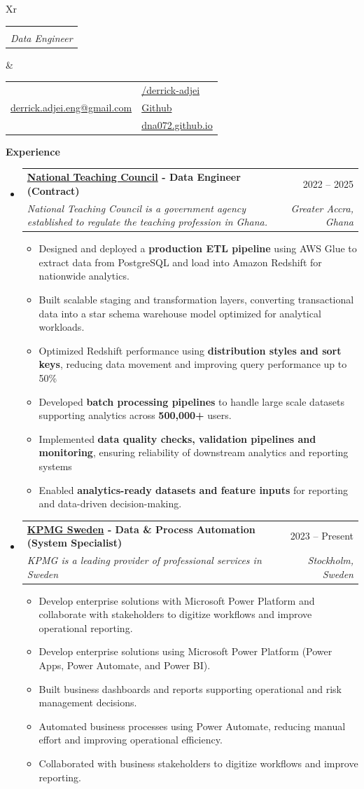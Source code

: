 \documentclass[a4paper,12pt]{article}[leftmargin=*]
\makeatletter
\def \fullname {Derrick Adjei}
\def \subtitle {Data Engineer}
\def \linkedinicon {\faLinkedin}
\def \linkedinlink {https://www.linkedin.com/in/derrick-adjei-5421289a/}
\def \linkedintext {/derrick-adjei}
\def \phoneicon {\faPhone}
\def \phonetext {+46-76-251-7998}
\def \emailicon {\faEnvelope}
\def \emaillink {mailto:derrick.adjei.eng@gmail.com}
\def \emailtext {derrick.adjei.eng@gmail.com}
\def \githubicon {\faGithub}
\def \githublink {https://github.com/Dna072/}
\def \githubtext {Github}
\def \websiteicon {\faGlobe}
\def \websitelink {https://dna072.github.io/}
\def \websitetext {dna072.github.io}
\def \headertype {\doublecol} %
\def \entryspacing {-0pt}
\def \linkedin {\linkedinicon \hspace{3pt}\href{\linkedinlink}{\linkedintext}}
\def \phone {\phoneicon \hspace{3pt}{ \phonetext}}
\def \email {\emailicon \hspace{3pt}\href{\emaillink}{\emailtext}}
\def \github {\githubicon \hspace{3pt}\href{\githublink}{\githubtext}}
\def \website {\websiteicon \hspace{3pt}\href{\websitelink}{\websitetext}}
\renewcommand{\section}[2]{\vspace{5pt}
  \colorbox{secondary}{\color{white}\raggedbottom\normalsize\textbf{{#1}{\hspace{7pt}#2}}}
}
\newcommand{\resumeEntryStart}{\begin{itemize}[leftmargin=2.5mm]}
\newcommand{\resumeEntryEnd}{\end{itemize}\vspace{\entryspacing}}
\newcommand{\resumeItemListStart}{\begin{itemize}[leftmargin=4.5mm]}
\newcommand{\resumeItemListEnd}{\end{itemize}}
\newcommand{\resumeItem}[1]{
  \item\small{
    {#1 \vspace{-2pt}}
  }
}
\newcommand{\resumeEntryTSDL}[4]{
  \vspace{-1pt}\item[]
    \begin{tabularx}{0.99\textwidth}{X@{\hspace{60pt}}r}
      \textbf{\color{primary}#1} & {\firabook\color{accent}\small#2} \\
      \textit{\color{accent}\small#3} & \textit{\color{accent}\small#4} \\
    \end{tabularx}\vspace{-7pt}
}
\newcommand{\doublecol}[6]{
  \begin{tabularx}{\textwidth}{Xr}
    {
      \begin{tabular}[c]{l}
        \fontsize{35}{45}\selectfont{\color{primary}{{\textbf{\fullname}}}} \\
        {\textit{\subtitle}} %
      \end{tabular}
    } & {
      \begin{tabular}[c]{l@{\hspace{1.5em}}l}
        {\small#4} & {\small#1} \\
        {\small#5} & {\small#2} \\
        {\small#6} & {\small#3}
      \end{tabular}
    }
  \end{tabularx}
}
\newcommand{\singlecol}[6]{
  \begin{tabularx}{\textwidth}{Xr}
    {
      \begin{tabular}[b]{l}
        \fontsize{35}{45}\selectfont{\color{primary}{{\textbf{\fullname}}}} \\
        {\textit{\subtitle}} %
      \end{tabular}
    } & {
      \begin{tabular}[c]{l}
        {\small#1} \\
        {\small#2} \\
        {\small#3} \\
        {\small#4} \\
        {\small#5} \\
        {\small#6}
      \end{tabular}
    }
  \end{tabularx}
}
\makeatother
\begin{document}


\headertype{\linkedin}{\github}{\website}{\phone}{\email}{} %
\vspace{-5pt} %

\vspace{5pt}
\section{\faPieChart}{Experience}
  \resumeEntryStart
    \vspace{-7pt}
    \resumeEntryTSDL
      {\href{https://ntc.gov.gh/}{National Teaching Council} - Data Engineer (Contract)}{2022 -- 2025}
      {National Teaching Council is a government agency established to regulate the teaching profession in Ghana.}{Greater Accra, Ghana}
    \resumeItemListStart
      \resumeItem {Designed and deployed a \textbf{production ETL pipeline} using AWS Glue to extract data from PostgreSQL and load into Amazon Redshift for nationwide analytics.}
      \resumeItem {Built scalable staging and transformation layers, converting transactional data into a star schema warehouse model optimized for analytical workloads.}
      \resumeItem {Optimized Redshift performance using \textbf{distribution styles and sort keys}, reducing data movement and improving query performance up to 50\%}
      \resumeItem {Developed \textbf{batch processing pipelines} to handle large scale datasets supporting analytics across \textbf{500,000+} users.}
      \resumeItem {Implemented \textbf{data quality checks, validation pipelines and monitoring}, ensuring reliability of downstream analytics and reporting systems}
      \resumeItem {Enabled \textbf{analytics-ready datasets and feature inputs} for reporting and data-driven decision-making.}
    \resumeItemListEnd
  \resumeEntryEnd

  \vspace{-10pt}
  \resumeEntryStart
    \resumeEntryTSDL
      {\href{https://kpmg.se/}{KPMG Sweden} - Data \& Process Automation (System Specialist)}{2023 -- Present}
      {KPMG is a leading provider of professional services in Sweden}{Stockholm, Sweden}
    \resumeItemListStart
      \resumeItem {Develop enterprise solutions with Microsoft Power Platform and collaborate with stakeholders to digitize workflows and improve operational reporting.}
      \resumeItem {Develop enterprise solutions using Microsoft Power Platform (Power Apps, Power Automate, and Power BI).}
      \resumeItem {Built business dashboards and reports supporting operational and risk management decisions.}
      \resumeItem {Automated business processes using Power Automate, reducing manual effort and improving operational efficiency.}
      \resumeItem {Collaborated with business stakeholders to digitize workflows and improve reporting. }
    \resumeItemListEnd
  \resumeEntryEnd
\end{document}
